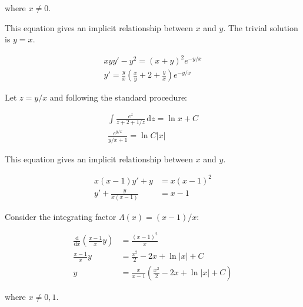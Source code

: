 \documentclass[12pt]{article}
\begin{document}
where $x \ne 0$.

This equation gives an implicit relationship between $x$ and $y$. The trivial solution is $y = x$.


\begin{equation}
    \begin{split}
        xy y' - y^{2} = (x + y)^{2} e^{-y/x} \\
        y' = \frac{y}{x} \left( \frac{x}{y} + 2 + \frac{y}{x} \right) e^{-y/x}
    \end{split}
\end{equation}

Let $z = y/x$ and following the standard procedure:

\begin{equation}
    \begin{split}
        \int \frac{e^{z}}{z + 2 + 1/z} \, \mathrm{d}z = \ln{x} + C \\
        \frac{e^{y/x}}{y/x + 1} = \ln{C\left\lvert x \right\rvert}
    \end{split}
\end{equation}

This equation gives an implicit relationship between $x$ and $y$.


\begin{equation}
    \begin{split}
        x(x - 1)y' + y &= x(x - 1)^{2} \\
        y' + \frac{y}{x(x - 1)} &= x - 1
    \end{split}
\end{equation}

Consider the integrating factor $\Lambda(x) = (x - 1)/x$:

\begin{equation}
    \begin{split}
        \frac{\mathrm{d}}{\mathrm{d}x} \left( \frac{x - 1}{x} y \right) &= \frac{(x - 1)^{2}}{x} \\
        \frac{x - 1}{x} y &= \frac{x^{2}}{2} - 2x + \ln{\left\lvert x \right\rvert} + C \\
        y &= \frac{x}{x - 1} \left( \frac{x^{2}}{2} - 2x + \ln{\left\lvert x \right\rvert} + C \right)
    \end{split}
\end{equation}

where $x \ne 0, 1$.

\end{document}

